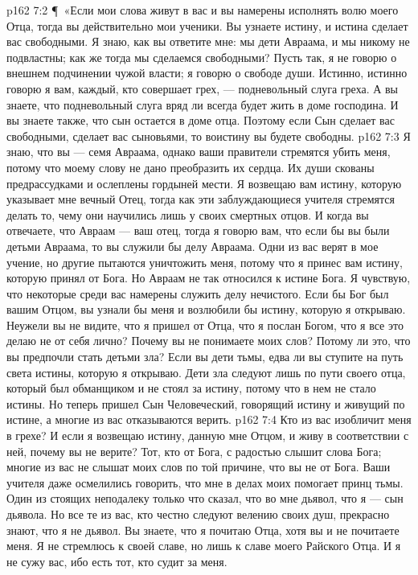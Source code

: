 \vs p162 7:2 \P\ «Если мои слова живут в вас и вы намерены исполнять волю моего Отца, тогда вы действительно мои ученики. Вы узнаете истину, и истина сделает вас свободными. Я знаю, как вы ответите мне: мы дети Авраама, и мы никому не подвластны; как же тогда мы сделаемся свободными? Пусть так, я не говорю о внешнем подчинении чужой власти; я говорю о свободе души. Истинно, истинно говорю я вам, каждый, кто совершает грех, --- подневольный слуга греха. А вы знаете, что подневольный слуга вряд ли всегда будет жить в доме господина. И вы знаете также, что сын остается в доме отца. Поэтому если Сын сделает вас свободными, сделает вас сыновьями, то воистину вы будете свободны.
\vs p162 7:3 Я знаю, что вы --- семя Авраама, однако ваши правители стремятся убить меня, потому что моему слову не дано преобразить их сердца. Их души скованы предрассудками и ослеплены гордыней мести. Я возвещаю вам истину, которую указывает мне вечный Отец, тогда как эти заблуждающиеся учителя стремятся делать то, чему они научились лишь у своих смертных отцов. И когда вы отвечаете, что Авраам --- ваш отец, тогда я говорю вам, что если бы вы были детьми Авраама, то вы служили бы делу Авраама. Одни из вас верят в мое учение, но другие пытаются уничтожить меня, потому что я принес вам истину, которую принял от Бога. Но Авраам не так относился к истине Бога. Я чувствую, что некоторые среди вас намерены служить делу нечистого. Если бы Бог был вашим Отцом, вы узнали бы меня и возлюбили бы истину, которую я открываю. Неужели вы не видите, что я пришел от Отца, что я послан Богом, что я все это делаю не от себя лично? Почему вы не понимаете моих слов? Потому ли это, что вы предпочли стать детьми зла? Если вы дети тьмы, едва ли вы ступите на путь света истины, которую я открываю. Дети зла следуют лишь по пути своего отца, который был обманщиком и не стоял за истину, потому что в нем не стало истины. Но теперь пришел Сын Человеческий, говорящий истину и живущий по истине, а многие из вас отказываются верить.
\vs p162 7:4 Кто из вас изобличит меня в грехе? И если я возвещаю истину, данную мне Отцом, и живу в соответствии с ней, почему вы не верите? Тот, кто от Бога, с радостью слышит слова Бога; многие из вас не слышат моих слов по той причине, что вы не от Бога. Ваши учителя даже осмелились говорить, что мне в делах моих помогает принц тьмы. Один из стоящих неподалеку только что сказал, что во мне дьявол, что я --- сын дьявола. Но все те из вас, кто честно следуют велению своих душ, прекрасно знают, что я не дьявол. Вы знаете, что я почитаю Отца, хотя вы и не почитаете меня. Я не стремлюсь к своей славе, но лишь к славе моего Райского Отца. И я не сужу вас, ибо есть тот, кто судит за меня.
